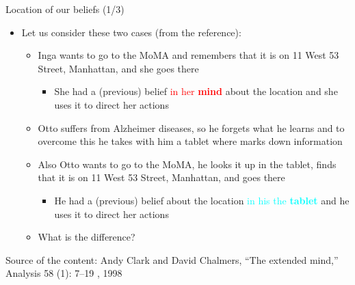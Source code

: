 \documentclass{beamer}
\begin{document}
\begin{frame}
{\centerline{Location of our beliefs (1/3)}}
\begin{itemize}
    \item Let us consider these two cases (from the reference):
    \begin{itemize}
    \item Inga wants to go to the MoMA and remembers that it is on 11 West 53 Street, Manhattan, and she goes there
        \begin{itemize}
    \item She had a (previous) belief  \textcolor{red}{in her \textbf{mind}} about the location and she uses it to direct her actions
    \end{itemize} 
    \item Otto suffers from Alzheimer diseases, so he forgets what he learns and to overcome this he takes with him a tablet where marks down information
    \item Also Otto wants to go to the MoMA, he looks it up in the tablet, finds that it is on 11 West 53 Street, Manhattan, and goes there
            \begin{itemize}
    \item He had a (previous) belief  about the location \textcolor{cyan}{in his the \textbf{tablet}} and he uses it to direct her actions
    \end{itemize} 
    \item What is the difference?
\end{itemize} 
\end{itemize} 

\begin{center}
    \tiny{Source of the content: Andy Clark and David Chalmers, ``The extended mind,'' Analysis 58 (1): 7--19 , 1998}
\end{center}

\end{frame}
\end{document}
